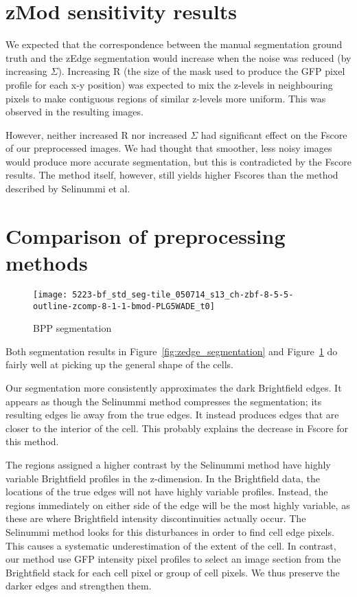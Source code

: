 \section{zMod sensitivity results}

We expected that the correspondence between the manual segmentation ground truth and the zEdge segmentation would increase when the noise was reduced (by increasing $\Sigma$). Increasing R (the size of the mask used to produce the GFP pixel profile for each x-y position) was expected to mix the z-levels in neighbouring pixels to make contiguous regions of similar z-levels more uniform. This was observed in the resulting images.

However, neither increased R nor increased $\Sigma$ had significant effect on the Fscore of our preprocessed images. We had thought that smoother, less noisy images would produce more accurate segmentation, but this is contradicted by the Fscore results. The method itself, however, still yields higher Fscores than the method described by Selinummi et al.

\section{Comparison of preprocessing methods}

\begin{figure}[htbp!]
\centering
\texttt{[image: 5223-bf\_std\_seg-tile\_050714\_s13\_ch-zbf-8-5-5-outline-zcomp-8-1-1-bmod-PLG5WADE\_t0]}
\caption{BPP segmentation}
\label{fig:bmod_segmentation}
\end{figure}

Both segmentation results in Figure~\ref{fig:zedge_segmentation} and Figure~\ref{fig:bmod_segmentation} do fairly well at picking up the general shape of the cells.

Our segmentation more consistently approximates the dark Brightfield edges. It appears as though the Selinummi method compresses the segmentation; its resulting edges lie away from the true edges. It instead produces edges that are closer to the interior of the cell. This probably explains the decrease in Fscore for this method.

The regions assigned a higher contrast by the Selinummi method have highly variable Brightfield profiles in the z-dimension. In the Brightfield data, the locations of the true edges will not have highly variable profiles. Instead, the regions immediately on either side of the edge will be the most highly variable, as these are where Brightfield intensity discontinuities actually occur. The Selinummi method looks for this disturbances in order to find cell edge pixels. This causes a systematic underestimation of the extent of the cell. In contrast, our method use GFP intensity pixel profiles to select an image section from the Brightfield stack for each cell pixel or group of cell pixels. We thus preserve the darker edges and strengthen them.
